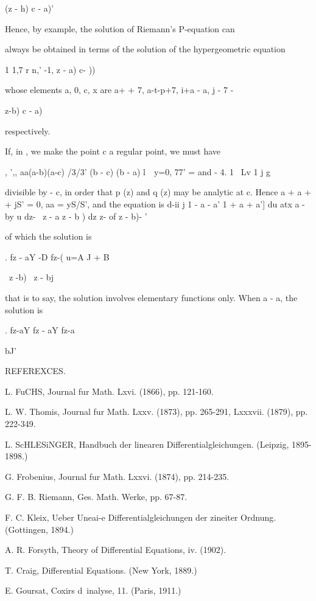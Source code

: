 (z - h) c - a)'

Hence, by  example, the solution of Riemann's P-equation can

always be obtained in terms of the solution of the hypergeometric
equation

1 1,7 r n,' -1, z - a) c- ))

whose elements a, 0, c, x are a+ + 7, a-t-p+7, i+a - a, j - 7 -

 z-b) c - a)

respectively.


If, in , we make the point c a regular point, we must have

, ',, aa(a-b)(a-c) /3/3' (b - c) (b - a) l\ \ y=0, 77' = and - 4. 1
\ Lv 1 j g

divisible by - c, in order that p (z) and q (z) may be analytic at c.
Hence a + a + + jS' = 0, aa = yS/S', and the equation is d-ii j 1 - a
- a' 1 + a + a'] du atx a - by u dz- \ z - a z - b ) dz z- of z - b)-
'

of which the solution is

. fz - aY -D fz-( u=A J + B

\ z -b) \ z - bj

that is to say, the solution involves elementary functions only. When
a - a, the solution is

. fz-aY fz - aY fz-a

bJ'

REFEREXCES.

L. FuCHS, Journal fur Math. Lxvi. (1866), pp. 121-160.

L. W. Thomis, Journal fur Math. Lxxv. (1873), pp. 265-291, Lxxxvii.
(1879), pp. 222-349.

L. ScHLESiNGER, Handbuch der linearen Differentialgleichungen.
(Leipzig, 1895-1898.)

G. Frobenius, Journal fur Math. Lxxvi. (1874), pp. 214-235.

G. F. B. Riemann, Ges. Math. Werke, pp. 67-87.

F. C. Kleix, Ueber Uneai-e Differentialgleichungen der zineiter
Ordnung. (Gottingen, 1894.)

A. R. Forsyth, Theory of Differential Equations, iv. (1902).

T. Craig, Differential Equations. (New York, 1889.)

E. Goursat, Coxirs d\ inalyse, 11. (Paris, 1911.)

